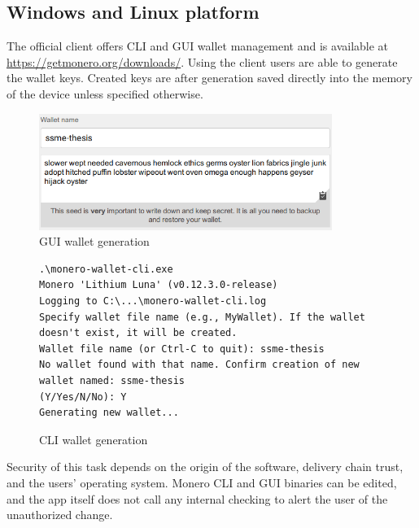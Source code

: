 \documentclass[
  printed, %
  table,   %
  nolof,     %
  nolot,     %
           oneside, color
]{fithesis3}
\begin{document}
\subsection{Windows and Linux platform}
The official client offers CLI and GUI wallet management and is available at \url{https://getmonero.org/downloads/}. Using the client users are able to generate the wallet keys. Created keys are after generation saved directly into the memory of the device unless specified otherwise. 
\begin{figure}[H]
\begin{center}
 \includegraphics[trim={0 0 0 0},clip,width=0.85\textwidth]{Screenshot_4.png}
    \caption{GUI wallet generation}
    \label{pic:guigenerator}
\end{center}
    \end{figure}

\begin{figure}[H]
\begin{center}
\begin{lstlisting}
.\monero-wallet-cli.exe
Monero 'Lithium Luna' (v0.12.3.0-release)
Logging to C:\...\monero-wallet-cli.log
Specify wallet file name (e.g., MyWallet). If the wallet 
doesn't exist, it will be created.
Wallet file name (or Ctrl-C to quit): ssme-thesis
No wallet found with that name. Confirm creation of new 
wallet named: ssme-thesis
(Y/Yes/N/No): Y
Generating new wallet...
\end{lstlisting}
\caption{CLI wallet generation}
    \label{pic:cligenerator}
\end{center}
    \end{figure}
Security of this task depends on the origin of the software, delivery chain trust, and the users' operating system. Monero CLI and GUI binaries can be edited, and the app itself does not call any internal checking to alert the user of the unauthorized change. 
\end{document}
